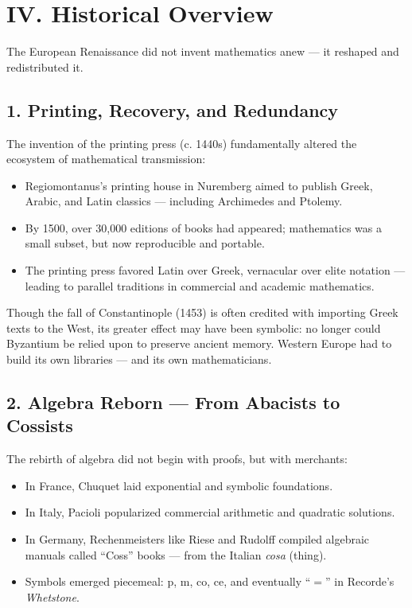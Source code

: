 \documentclass[9pt]{article}
\begin{document}
\newpage


\section*{IV. Historical Overview}

The European Renaissance did not invent mathematics anew — it reshaped and redistributed it.

\subsection*{1. Printing, Recovery, and Redundancy}

The invention of the printing press (c. 1440s) fundamentally altered the ecosystem of mathematical transmission:

\begin{itemize}
    \item Regiomontanus’s printing house in Nuremberg aimed to publish Greek, Arabic, and Latin classics — including Archimedes and Ptolemy.
    \item By 1500, over 30,000 editions of books had appeared; mathematics was a small subset, but now reproducible and portable.
    \item The printing press favored Latin over Greek, vernacular over elite notation — leading to parallel traditions in commercial and academic mathematics.
\end{itemize}

Though the fall of Constantinople (1453) is often credited with importing Greek texts to the West, its greater effect may have been symbolic: no longer could Byzantium be relied upon to preserve ancient memory. Western Europe had to build its own libraries — and its own mathematicians.

\subsection*{2. Algebra Reborn — From Abacists to Cossists}

The rebirth of algebra did not begin with proofs, but with merchants:

\begin{itemize}
    \item In France, Chuquet laid exponential and symbolic foundations.
    \item In Italy, Pacioli popularized commercial arithmetic and quadratic solutions.
    \item In Germany, Rechenmeisters like Riese and Rudolff compiled algebraic manuals called ``Coss'' books — from the Italian \textit{cosa} (thing).
    \item Symbols emerged piecemeal: p, m, co, ce, and eventually ``$=$'' in Recorde’s \textit{Whetstone}.
\end{itemize}
\end{document}
